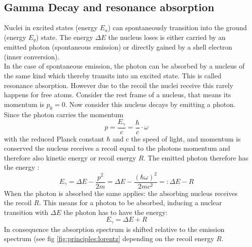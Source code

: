 \subsection{Gamma Decay and resonance absorption}
Nuclei in excited states (energy $E_a$) can spontaneously transition into the ground (energy $E_g$) state. The energy $\Delta E$ the nucleus loses is either carried by an emitted photon (spontaneous emission) or directly gained by a shell electron (inner conversion). \\
In the case of spontaneous emission, the photon can be absorbed by a nucleus of the same kind which thereby transits into an excited state. This is called resonance absorption. However due to the recoil the nuclei receive this rarely happens for free atoms.
Consider the rest frame of a nucleus, that means its momentum is $p_0 = 0$. Now consider this nucleus decays by emitting a photon. Since the photon carries the momentum 
\begin{equation}
 p = \frac{E_\gamma}{c}= \frac{\hbar}{c}\cdot \omega
\label{eq:momentum}
\end{equation}
with the reduced Planck constant $\hbar$ and c the speed of light, and momentum is conserved the nucleus receives a recoil equal to the photons momentum and therefore also kinetic energy or recoil energy $R$. The emitted photon therefore has the energy \cite{Eyges}:
\begin{equation}
E_\gamma=\Delta E - \frac{p^2}{2m} = \Delta E - \frac{(\hbar \omega)^2}{2mc^2} =:\Delta E-R
\label{eq:recoil:emission}
\end{equation}
When the photon is absorbed the same applies: the absorbing nucleus receives the recoil $R$. This means for a photon to be absorbed, inducing a nuclear transition with $\Delta E$ the photon has to have the energy:
\begin{equation}
E_\gamma=\Delta E + R
\label{eq:recoil:absorbtion}
\end{equation}
In consequence the absorption spectrum is shifted relative to the emission spectrum (see fig \ref{fig:principles:lorentz} depending on the recoil energy $R$.

